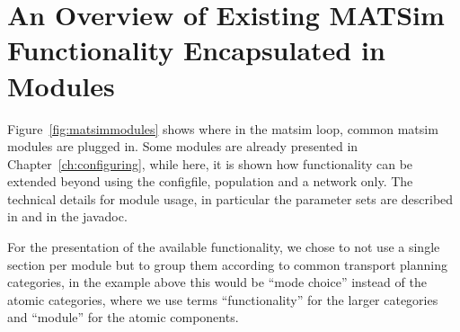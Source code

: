 
\section{An Overview of Existing MATSim Functionality Encapsulated in Modules}
Figure~\ref{fig:matsimmodules} shows where in the \gls{matsim} loop, common \gls{matsim} modules are plugged in. Some modules are already presented in Chapter~\ref{ch:configuring}, while here, it is shown how functionality can be extended beyond using the \gls{configfile}, population and a network only. The technical details for module usage, in particular the parameter sets are described in \citep[][]{MATSim_Userguide_2015} and in the \gls{javadoc}.

For the presentation of the available functionality, we chose to not use a single section per module but to group them according to common transport planning categories, in the example above this would be ``mode choice'' instead of the atomic categories, where we use terms ``functionality'' for the larger categories and ``module'' for the atomic components. %

